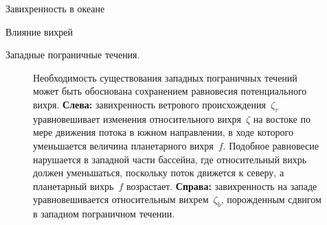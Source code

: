 \begin{chapter}{Завихренность в океане}
\begin{section}{Влияние вихрей}
\begin{paragraph}{Западные пограничные течения.}
\begin{figure}[t!]
\caption{Необходимость существования западных пограничных течений может
быть обоснована сохранением равновесия потенциального вихря.
\textbf{Слева:} завихренность ветрового происхождения~$\zeta_{\tau}$
уравновешивает изменения относительного вихря~$\zeta$ на востоке по мере 
движения потока в южном направлении, в ходе которого уменьшается величина
планетарного вихря~$f$. Подобное равновесие нарушается в западной части
бассейна, где относительный вихрь должен уменьшаться, поскольку поток движется 
к северу, а планетарный вихрь~$f$ возрастает. 
\textbf{Справа:} завихренность на западе уравновешивается относительным 
вихрем~$\zeta_b$, порожденным сдвигом в западном пограничном течении.}
\label{fig:westbdycurrent}
\vfill
\end{figure}
%
\end{paragraph}
\end{section}


\end{chapter}
